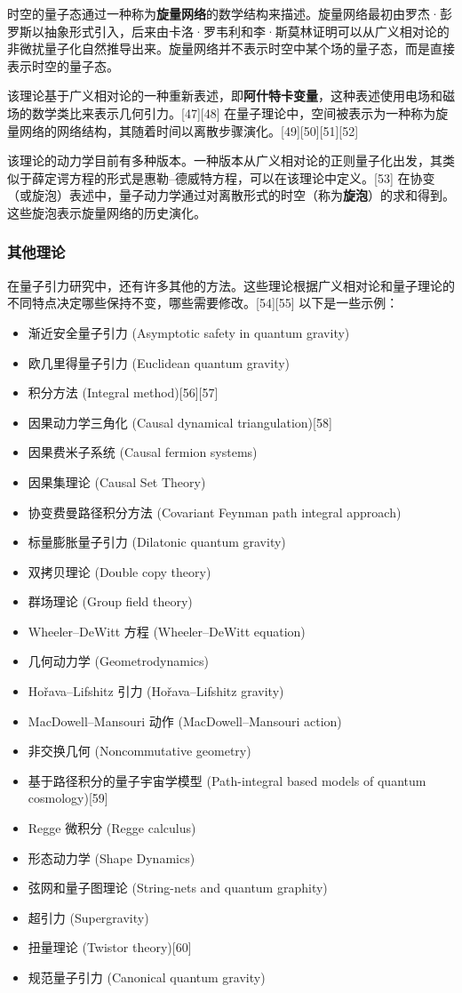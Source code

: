 时空的量子态通过一种称为\textbf{旋量网络}的数学结构来描述。旋量网络最初由罗杰·彭罗斯以抽象形式引入，后来由卡洛·罗韦利和李·斯莫林证明可以从广义相对论的非微扰量子化自然推导出来。旋量网络并不表示时空中某个场的量子态，而是直接表示时空的量子态。

该理论基于广义相对论的一种重新表述，即\textbf{阿什特卡变量}，这种表述使用电场和磁场的数学类比来表示几何引力。[47][48] 在量子理论中，空间被表示为一种称为旋量网络的网络结构，其随着时间以离散步骤演化。[49][50][51][52]

该理论的动力学目前有多种版本。一种版本从广义相对论的正则量子化出发，其类似于薛定谔方程的形式是惠勒–德威特方程，可以在该理论中定义。[53] 在协变（或旋泡）表述中，量子动力学通过对离散形式的时空（称为\textbf{旋泡}）的求和得到。这些旋泡表示旋量网络的历史演化。
\subsubsection{其他理论}
在量子引力研究中，还有许多其他的方法。这些理论根据广义相对论和量子理论的不同特点决定哪些保持不变，哪些需要修改。[54][55] 以下是一些示例：
\begin{itemize}
\item 渐近安全量子引力 (Asymptotic safety in quantum gravity)  
\item 欧几里得量子引力 (Euclidean quantum gravity)  
\item 积分方法 (Integral method)[56][57]  
\item 因果动力学三角化 (Causal dynamical triangulation)[58]  
\item 因果费米子系统 (Causal fermion systems)  
\item 因果集理论 (Causal Set Theory)  
\item 协变费曼路径积分方法 (Covariant Feynman path integral approach)  
\item 标量膨胀量子引力 (Dilatonic quantum gravity)  
\item 双拷贝理论 (Double copy theory)  
\item 群场理论 (Group field theory)  
\item Wheeler–DeWitt 方程 (Wheeler–DeWitt equation)  
\item 几何动力学 (Geometrodynamics)  
\item Hořava–Lifshitz 引力 (Hořava–Lifshitz gravity)  
\item MacDowell–Mansouri 动作 (MacDowell–Mansouri action)  
\item 非交换几何 (Noncommutative geometry)  
\item 基于路径积分的量子宇宙学模型 (Path-integral based models of quantum cosmology)[59]  
\item Regge 微积分 (Regge calculus)  
\item 形态动力学 (Shape Dynamics)  
\item 弦网和量子图理论 (String-nets and quantum graphity)  
\item 超引力 (Supergravity)  
\item 扭量理论 (Twistor theory)[60]  
\item 规范量子引力 (Canonical quantum gravity)
\end{itemize}
